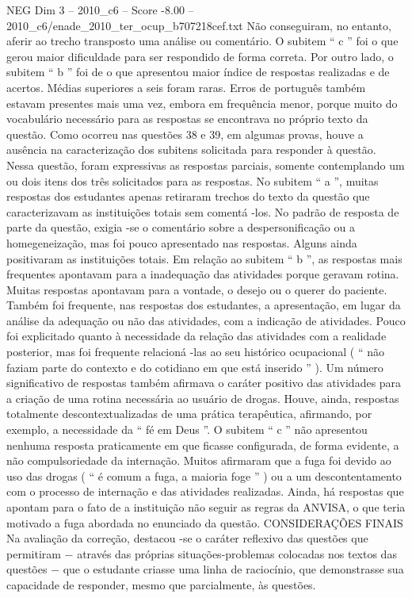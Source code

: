 \begin{textsample}{NEG Dim 3 – 2010\_c6 – Score -8.00 – 2010\_c6/enade\_2010\_ter\_ocup\_b707218cef.txt}
Não conseguiram, no entanto, aferir ao trecho transposto uma análise ou comentário.
O subitem “ c ” foi o que gerou maior dificuldade para ser respondido de forma correta.
Por outro lado, o subitem “ b ” foi de o que apresentou maior índice de respostas realizadas e de acertos.
Médias superiores a seis foram raras.
Erros de português também estavam presentes mais uma vez, embora em frequência menor, porque muito do vocabulário necessário para as respostas se encontrava no próprio texto da questão.
Como ocorreu nas questões 38 e 39, em algumas provas, houve a ausência na caracterização dos subitens solicitada para responder à questão.
Nessa questão, foram expressivas as respostas parciais, somente contemplando um ou dois itens dos três solicitados para as respostas.
No subitem “ a ”, muitas respostas dos estudantes apenas retiraram trechos do texto da questão que caracterizavam as instituições totais sem comentá -los.
No padrão de resposta de parte da questão, exigia -se o comentário sobre a despersonificação ou a homegeneização, mas foi pouco apresentado nas respostas.
Alguns ainda positivaram as instituições totais.
Em relação ao subitem “ b ”, as respostas mais frequentes apontavam para a inadequação das atividades porque geravam rotina.
Muitas respostas apontavam para a vontade, o desejo ou o querer do paciente.
Também foi frequente, nas respostas dos estudantes, a apresentação, em lugar da análise da adequação ou não das atividades, com a indicação de atividades.
Pouco foi explicitado quanto à necessidade da relação das atividades com a realidade posterior, mas foi frequente relacioná -las ao seu histórico ocupacional ( “ não faziam parte do contexto e do cotidiano em que está inserido ” ).
Um número significativo de respostas também afirmava o caráter positivo das atividades para a criação de uma rotina necessária ao usuário de drogas.
Houve, ainda, respostas totalmente descontextualizadas de uma prática terapêutica, afirmando, por exemplo, a necessidade da “ fé em Deus ”.
O subitem “ c ” não apresentou nenhuma resposta praticamente em que ficasse configurada, de forma evidente, a não compulsoriedade da internação.
Muitos afirmaram que a fuga foi devido ao uso das drogas ( “ é comum a fuga, a maioria foge ” ) ou a um descontentamento com o processo de internação e das atividades realizadas.
Ainda, há respostas que apontam para o fato de a instituição não seguir as regras da ANVISA, o que teria motivado a fuga abordada no enunciado da questão.
CONSIDERAÇÕES FINAIS Na avaliação da correção, destacou -se o caráter reflexivo das questões que permitiram − através das próprias situações-problemas colocadas nos textos das questões − que o estudante criasse uma linha de raciocínio, que demonstrasse sua capacidade de responder, mesmo que parcialmente, às questões.

\end{textsample}
